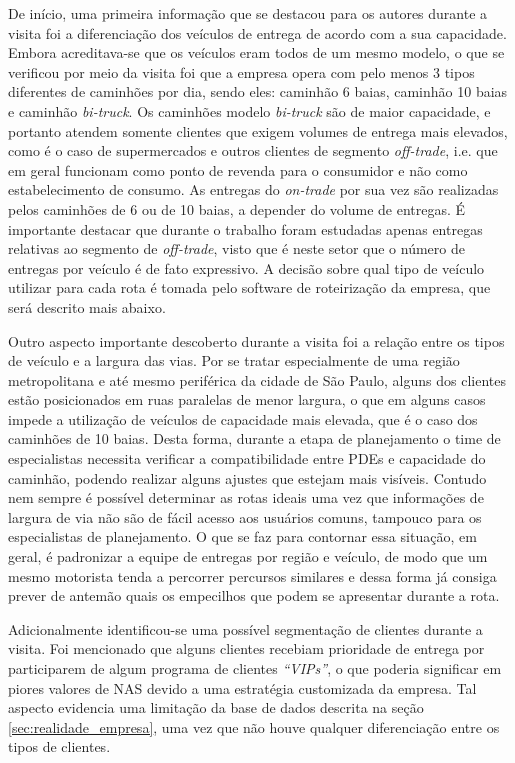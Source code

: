 De início, uma primeira informação que se destacou para os autores durante a visita foi a diferenciação dos veículos de entrega de acordo com a sua capacidade.
Embora acreditava-se que os veículos eram todos de um mesmo modelo, o que se verificou por meio da visita foi que a empresa opera com pelo menos 3 tipos diferentes de caminhões por dia, sendo eles: caminhão 6 baias, caminhão 10 baias e caminhão \textit{bi-truck}.
Os caminhões modelo \textit{bi-truck} são de maior capacidade, e portanto atendem somente clientes que exigem volumes de entrega mais elevados, como é o caso de supermercados e outros clientes de segmento \textit{off-trade}, i.e. que em geral funcionam como ponto de revenda para o consumidor e não como estabelecimento de consumo. 
As entregas do \textit{on-trade} por sua vez são realizadas pelos caminhões de 6 ou de 10 baias, a depender do volume de entregas. 
É importante destacar que durante o trabalho foram estudadas apenas entregas relativas ao segmento de \textit{off-trade}, visto que é neste setor que o número de entregas por veículo é de fato expressivo.
A decisão sobre qual tipo de veículo utilizar para cada rota é tomada pelo software de roteirização da empresa, que será descrito mais abaixo.

Outro aspecto importante descoberto durante a visita foi a relação entre os tipos de veículo e a largura das vias.
Por se tratar especialmente de uma região metropolitana e até mesmo periférica da cidade de São Paulo, alguns dos clientes estão posicionados em ruas paralelas de menor largura, o que em alguns casos impede a utilização de veículos de capacidade mais elevada, que é o caso dos caminhões de 10 baias.
Desta forma, durante a etapa de planejamento o time de especialistas necessita verificar a compatibilidade entre PDEs e capacidade do caminhão, podendo realizar alguns ajustes que estejam mais visíveis.
Contudo nem sempre é possível determinar as rotas ideais uma vez que informações de largura de via não são de fácil acesso aos usuários comuns, tampouco para os especialistas de planejamento.
O que se faz para contornar essa situação, em geral, é padronizar a equipe de entregas por região e veículo, de modo que um mesmo motorista tenda a percorrer percursos similares e dessa forma já consiga prever de antemão quais os empecilhos que podem se apresentar durante a rota.

Adicionalmente identificou-se uma possível segmentação de clientes durante a visita. 
Foi mencionado que alguns clientes recebiam prioridade de entrega por participarem de algum programa de clientes \textit{``VIPs''}, o que poderia significar em piores valores de NAS devido a uma estratégia customizada da empresa. 
Tal aspecto evidencia uma limitação da base de dados descrita na seção \ref{sec:realidade_empresa}, uma vez que não houve qualquer diferenciação entre os tipos de clientes.

